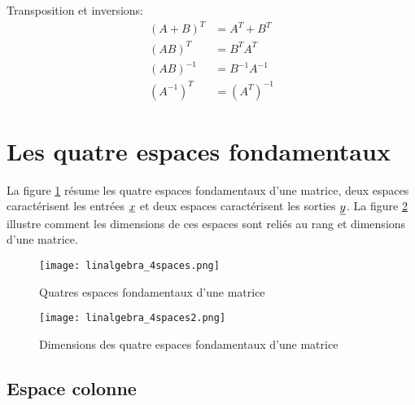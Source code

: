 Transposition et inversions:
\begin{align}
(A+B)^T &= A^T + B^T \\
(AB)^T &= B^TA^T \\
(AB)^{-1} &= B^{-1}A^{-1} \\
(A^{-1})^T &= (A^{T})^{-1} 
\end{align}



\newpage
\section{Les quatre espaces fondamentaux}
\label{sec:4espfond}

La figure \ref{fig:4spaces} résume les quatre espaces fondamentaux d'une matrice, deux espaces caractérisent les entrées $\underline{x}$ et deux espaces caractérisent les sorties $\underline{y}$. La figure \ref{fig:4spaces2} illustre comment les dimensions de ces espaces sont reliés au rang et dimensions d'une matrice.

\begin{figure}[H]
	\centering
		\texttt{[image: linalgebra\_4spaces.png]}
	\caption{Quatres espaces fondamentaux d'une matrice}
	\label{fig:4spaces}
\end{figure}

\begin{figure}[H]
	\centering
		\texttt{[image: linalgebra\_4spaces2.png]}
	\caption{Dimensions des quatre espaces fondamentaux d'une matrice}
	\label{fig:4spaces2}
\end{figure}


\subsection{Espace colonne}
\label{sec:espcol}

